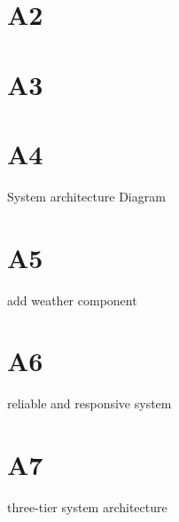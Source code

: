 \documentclass[12pt]{scrartcl}
\begin{document}
\section*{A2}

\section*{A3}


\section*{A4}
System architecture Diagram

\section*{A5}
add weather component

\section*{A6}
reliable and responsive system

\section*{A7}
three-tier system architecture

\end{document}
